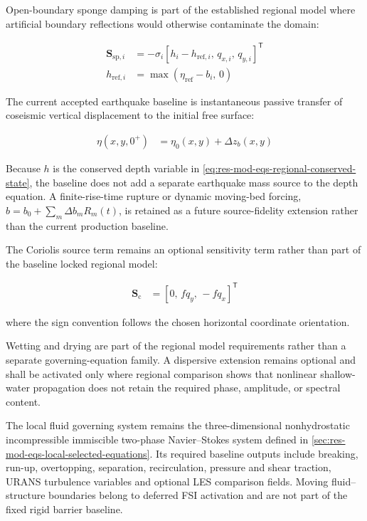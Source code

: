 Open-boundary sponge damping is part of the established regional model
where artificial boundary reflections would otherwise contaminate the
domain:

\begin{align}
  \mathbf{S}_{\mathrm{sp},i}
  &=
  -\sigma_i
  \left[
    h_i-h_{\mathrm{ref},i},\,
    q_{x,i},\,
    q_{y,i}
  \right]^{\mathsf{T}}
  \label{eq:res-mod-eqs-regional-sponge-source}
  \\
  h_{\mathrm{ref},i}
  &=
  \max
  \left(
    \eta_{\mathrm{ref}}
    -
    b_i,\,
    0
  \right)
  \label{eq:res-mod-eqs-regional-sponge-reference-depth}
\end{align}

The current accepted earthquake baseline is instantaneous passive
transfer of coseismic vertical displacement to the initial free
surface:

\begin{align}
  \eta(x,y,0^+)
  &=
  \eta_0(x,y)
  +
  \Delta z_b(x,y)
  \label{eq:res-mod-eqs-regional-passive-earthquake-transfer}
\end{align}

Because $h$ is the conserved depth variable in
\cref{eq:res-mod-eqs-regional-conserved-state}, the baseline does not
add a separate earthquake mass source to the depth equation. A
finite-rise-time rupture or dynamic moving-bed forcing,
$b=b_0+\sum_m\Delta b_m R_m(t)$, is retained as a future
source-fidelity extension rather than the current production baseline.

The Coriolis source term remains an optional sensitivity term rather
than part of the baseline locked regional model:

\begin{align}
  \mathbf{S}_{\mathrm{c}}
  &=
  \left[
    0,\,
    f q_y,\,
    -f q_x
  \right]^{\mathsf{T}}
  \label{eq:res-mod-eqs-regional-coriolis-source}
\end{align}

where the sign convention follows the chosen horizontal coordinate
orientation.

Wetting and drying are part of the regional model requirements rather
than a separate governing-equation family. A dispersive extension
remains optional and shall be activated only where regional comparison
shows that nonlinear shallow-water propagation does not retain the
required phase, amplitude, or spectral content.

The local fluid governing system remains the three-dimensional
nonhydrostatic incompressible immiscible two-phase Navier--Stokes
system defined in
\cref{sec:res-mod-eqs-local-selected-equations}. Its required baseline
outputs include breaking, run-up, overtopping, separation,
recirculation, pressure and shear traction, URANS turbulence variables
and optional LES comparison fields. Moving fluid--structure boundaries
belong to deferred FSI activation and are not part of the fixed rigid
barrier baseline.

